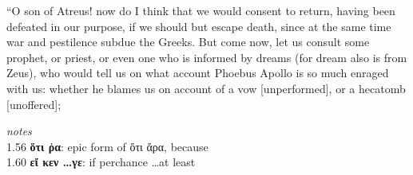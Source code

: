 \documentclass{ransom}
\begin{document}
“O son of Atreus! now do I think that we would consent to return,
having been defeated in our purpose, if we should but escape death,
since at the same time war and pestilence subdue the Greeks. But
come now, let us consult some prophet, or priest, or even one who is
informed by dreams (for dream also is from Zeus), who would tell us
on what account Phoebus Apollo is so much enraged with us: whether he
blames us on account of a vow [unperformed], or a hecatomb [unoffered];
    \par
    \textit{notes}\\
    1.56 \textbf{ὅτι ῥα}: epic form of ὅτι ἄρα, because\\1.60 \textbf{εἴ κεν \ldots γε}: if perchance \ldots at least
    \begin{vocabpage}
\begin{vocabcommon}
\\\\\\\\\\\\\\\\\\\\\\\\\\\\\\\\\\\\\\\\\\\\\\\end{vocabcommon}

\end{vocabpage}
\end{document}
